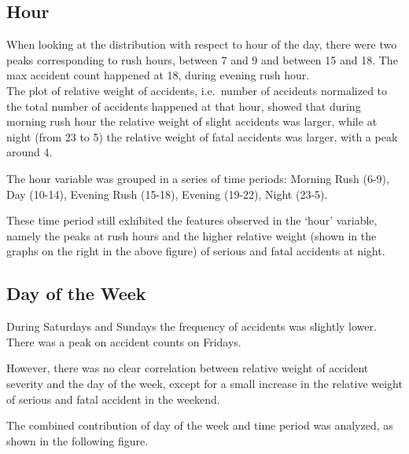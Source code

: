 \documentclass[11pt]{article}
\begin{document}
    \hypertarget{hour}{%
\subsection{Hour}\label{hour}}

When looking at the distribution with respect to hour of the day, there were two peaks corresponding to rush hours, between 7 and 9 and between 15 and 18. The max accident count happened at 18, during evening rush hour.\\
The plot of relative weight of accidents, i.e.~number of accidents normalized to the total number of accidents happened at that hour, showed that during morning rush hour the relative weight of slight accidents was larger, while at night (from 23 to 5) the relative weight of fatal accidents was larger, with a peak around 4.

The hour variable was grouped in a series of time periods: Morning Rush (6-9), Day (10-14), Evening Rush (15-18), Evening (19-22), Night (23-5).

    \begin{center}
    \end{center}

These time period still exhibited the features observed in the `hour' variable, namely the peaks at rush hours and the higher relative weight (shown in the graphs on the right in the above figure) of serious and fatal accidents at night.

    \hypertarget{day-of-the-week}{%
\subsection{Day of the Week}\label{day-of-the-week}}

    \begin{center}
    \end{center}

During Saturdays and Sundays the frequency of accidents was slightly lower. There was a peak on accident counts on Fridays.

However, there was no clear correlation between relative weight of accident severity and the day of the week, except for a small increase in the relative weight of serious and fatal accident in the weekend.

The combined contribution of day of the week and time period was analyzed, as shown in the following figure.
\end{document}
